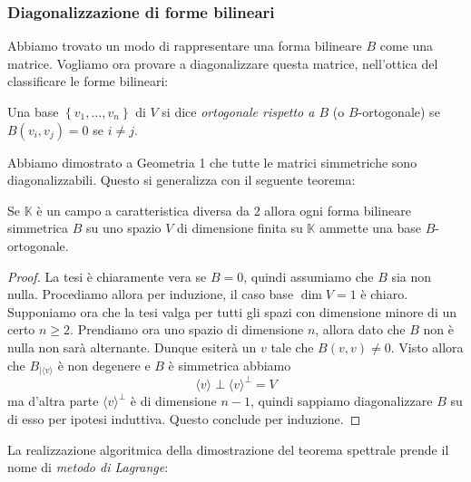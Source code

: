 \documentclass[11pt]{scrartcl}
\newcommand{\KK}{\mathbb{K}}
\begin{document}
	\subsubsection{Diagonalizzazione di forme bilineari}
	
	Abbiamo trovato un modo di rappresentare una forma bilineare $B$ come una matrice. Vogliamo ora provare a diagonalizzare questa matrice, nell'ottica del classificare le forme bilineari:
	\begin{definition}
		Una base $\left\{v_1,\dots,v_n\right\}$ di $V$ si dice \textit{ortogonale rispetto a $B$} (o $B$-ortogonale) se $B(v_i,v_j)=0$ se $i\ne j$.
	\end{definition}
	Abbiamo dimostrato a Geometria 1 che tutte le matrici simmetriche sono diagonalizzabili. Questo si generalizza con il seguente teorema:
	\begin{theorem}
		Se $\KK$ è un campo a caratteristica diversa da $2$ allora ogni forma bilineare simmetrica $B$ su uno spazio $V$ di dimensione finita su $\KK$ ammette una base $B$-ortogonale.
	\end{theorem}
	\begin{proof}
		La tesi è chiaramente vera se $B=0$, quindi assumiamo che $B$ sia non nulla. Procediamo allora per induzione, il caso base $\dim V=1$ è chiaro. Supponiamo ora che la tesi valga per tutti gli spazi con dimensione minore di un certo $n\ge 2$. Prendiamo ora uno spazio di dimensione $n$, allora dato che $B$ non è nulla non sarà alternante. Dunque esiterà un $v$ tale che $B(v,v)\ne 0$. Visto allora che $B_{\mid \langle v \rangle}$ è non degenere e $B$ è simmetrica abbiamo
		$$\langle v \rangle \perp \langle v \rangle^\perp = V$$
		ma d'altra parte $\langle v \rangle^\perp$ è di dimensione $n-1$, quindi sappiamo diagonalizzare $B$ su di esso per ipotesi induttiva. Questo conclude per induzione.
	\end{proof}
	La realizzazione algoritmica della dimostrazione del teorema spettrale prende il nome di \textit{metodo di Lagrange}:
\end{document}
